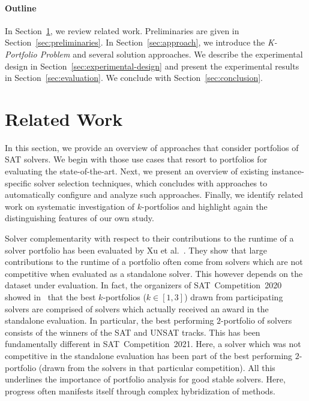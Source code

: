 \documentclass[conference]{IEEEtran}
\begin{document}
\paragraph{Outline}

In Section~\ref{sec:related-work}, we review related work. 
Preliminaries are given in Section~\ref{sec:preliminaries}. 
In Section~\ref{sec:approach}, we introduce the \emph{K-Portfolio Problem} and several solution approaches. 
We describe the experimental design in Section~\ref{sec:experimental-design} and present the experimental results in Section~\ref{sec:evaluation}. 
We conclude with Section~\ref{sec:conclusion}. 

\section{Related Work}
\label{sec:related-work}

In this section, we provide an overview of approaches that consider portfolios of SAT solvers. 
We begin with those use cases that resort to portfolios for evaluating the state-of-the-art. 
Next, we present an overview of existing instance-specific solver selection techniques, which concludes with approaches to automatically configure and analyze such approaches. 
Finally, we identify related work on systematic investigation of $k$-portfolios and highlight again the distinguishing features of our own study. 

Solver complementarity with respect to their contributions to the runtime of a solver portfolio has been evaluated by Xu et al.~\cite{Xu:2012:EvalContribVBS}. 
They show that large contributions to the runtime of a portfolio often come from solvers which are not competitive when evaluated as a standalone solver. 
This however depends on the dataset under evaluation. 
In fact, the organizers of SAT~Competition~2020 showed in~\cite{SC2020:AIJ} that the best $k$-portfolios ($k \in [1,3]$) drawn from participating solvers are comprised of solvers which actually received an award in the standalone evaluation.
In particular, the best performing $2$-portfolio of solvers consists of the winners of the SAT and UNSAT tracks. 
This has been fundamentally different in SAT~Competition~2021. Here, a solver which was not competitive in the standalone evaluation has been part of the best performing $2$-portfolio (drawn from the solvers in that particular competition). 
All this underlines the importance of portfolio analysis for good stable solvers. Here, progress often manifests itself through complex hybridization of methods. 
\end{document}

